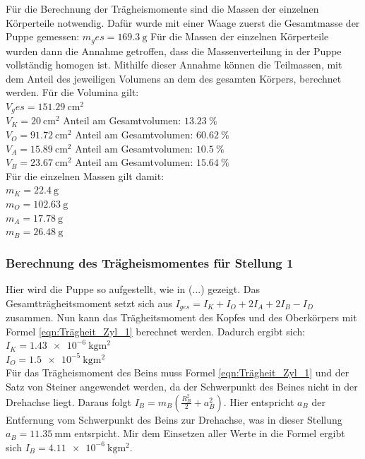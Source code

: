     Für die Berechnung der Trägheismomente sind die Massen der einzelnen Körperteile notwendig.
    Dafür wurde mit einer Waage zuerst die Gesamtmasse der Puppe gemessen: $m_ges=\qty{169.3}{\gram}$
    Für die Massen der einzelnen Körperteile wurden dann die Annahme getroffen, dass die Massenverteilung in der Puppe vollständig homogen ist.
    Mithilfe dieser Annahme können die Teilmassen, mit dem Anteil des jeweiligen Volumens an dem des gesamten Körpers, berechnet werden.
    Für die Volumina gilt:\\
    $V_ges=\qty{151.29}{\centi\meter\squared}$\\
    $V_K=\qty{20}{\centi\meter\squared}$ Anteil am Gesamtvolumen: $\qty{13.23}{\percent}$\\
    $V_O=\qty{91.72}{\centi\meter\squared}$ Anteil am Gesamtvolumen: $\qty{60.62}{\percent}$\\
    $V_A=\qty{15.89}{\centi\meter\squared}$ Anteil am Gesamtvolumen: $\qty{10.5}{\percent}$\\
    $V_B=\qty{23.67}{\centi\meter\squared}$ Anteil am Gesamtvolumen: $\qty{15.64}{\percent}$\\

    Für die einzelnen Massen gilt damit:\\
    $m_K=\qty{22.4}{\gram}$\\
    $m_O=\qty{102.63}{\gram}$\\
    $m_A=\qty{17.78}{\gram}$\\
    $m_B=\qty{26.48}{\gram}$\\

    \subsubsection{Berechnung des Trägheismomentes für Stellung 1}
    Hier wird die Puppe so aufgestellt, wie in (...) gezeigt.%
    Das Gesamtträgheitsmoment setzt sich aus $I_{ges}=I_K+I_O+2I_A+2I_B-I_D$ zusammen.
    Nun kann das Trägheitsmoment des Kopfes und des Oberkörpers mit Formel \ref{eqn:Trägheit_Zyl_1} berechnet werden.
    Dadurch ergibt sich:\\
    $I_K=\qty{1.43e-6}{\kilo\gram\meter\squared}$\\
    $I_O=\qty{1.5e-5}{\kilo\gram\meter\squared}$\\
    
    Für das Trägheismoment des Beins muss Formel \ref{eqn:Trägheit_Zyl_1} und der Satz von Steiner angewendet werden, da der  Schwerpunkt des Beines nicht in der Drehachse liegt.
    Daraus folgt $I_B=m_B(\frac{R_B^2}{2}+a_B^2)$.
    Hier entspricht $a_B$ der Entfernung vom Schwerpunkt des Beins zur Drehachse, was in dieser Stellung $a_B=\qty{11.35}{\milli\meter}$ entsrpicht.
    Mir dem Einsetzen aller Werte in die Formel ergibt sich $I_B=\qty{4.11e-6}{\kilo\gram\meter\squared}$.\\

